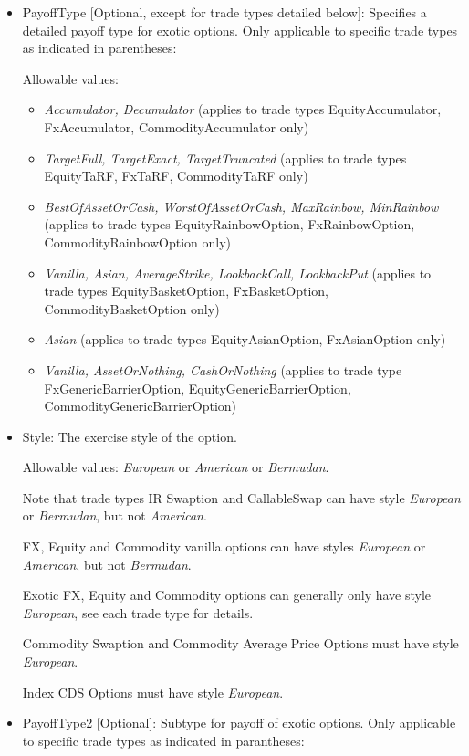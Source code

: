 \begin{itemize}
\item PayoffType [Optional, except for trade types detailed below]: Specifies a detailed payoff type for exotic options. Only applicable to specific trade types as
  indicated in parentheses:

  Allowable values:
  \begin{itemize}
  \item \emph{Accumulator, Decumulator} (applies to trade types EquityAccumulator, FxAccumulator, CommodityAccumulator only)
  \item \emph{TargetFull, TargetExact, TargetTruncated} (applies to trade types EquityTaRF, FxTaRF, CommodityTaRF only)
  \item \emph{BestOfAssetOrCash, WorstOfAssetOrCash, MaxRainbow, MinRainbow} (applies to trade types EquityRainbowOption,
    FxRainbowOption, CommodityRainbowOption only)
  \item \emph{Vanilla, Asian, AverageStrike, LookbackCall, LookbackPut} (applies to trade types EquityBasketOption,
    FxBasketOption, CommodityBasketOption only)
  \item \emph{Asian} (applies to trade types EquityAsianOption, FxAsianOption only)
  \item \emph{Vanilla, AssetOrNothing, CashOrNothing} (applies to trade type FxGenericBarrierOption, EquityGenericBarrierOption, CommodityGenericBarrierOption)
  \end{itemize}

\item Style: The exercise style of the option. 

  Allowable values: \emph{European} or \emph{American} or \emph{Bermudan}. 
  
  Note that trade types IR Swaption and CallableSwap can have style
  \emph{European} or \emph{Bermudan}, but not \emph{American}.  
  
  FX, Equity and Commodity vanilla options can have styles \emph{European}
  or \emph{American}, but not \emph{Bermudan}. 
  
  Exotic FX, Equity and Commodity  options can generally only have style \emph{European}, see each trade type for details.
  
  Commodity Swaption and Commodity Average Price Options must have style \emph{European}. 
  
  Index CDS Options must have style  \emph{European}. 

\item PayoffType2 [Optional]: Subtype for payoff of exotic options. Only applicable to specific trade types as indicated in parantheses:


\end{itemize}
